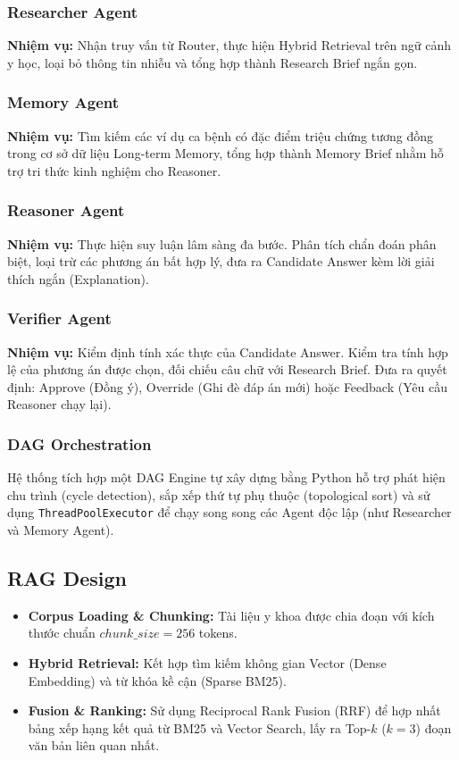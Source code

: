 \subsubsection{Researcher Agent}
\textbf{Nhiệm vụ:} Nhận truy vấn từ Router, thực hiện Hybrid Retrieval trên ngữ cảnh y học, loại bỏ thông tin nhiễu và tổng hợp thành Research Brief ngắn gọn.

\subsubsection{Memory Agent}
\textbf{Nhiệm vụ:} Tìm kiếm các ví dụ ca bệnh có đặc điểm triệu chứng tương đồng trong cơ sở dữ liệu Long-term Memory, tổng hợp thành Memory Brief nhằm hỗ trợ tri thức kinh nghiệm cho Reasoner.

\subsubsection{Reasoner Agent}
\textbf{Nhiệm vụ:} Thực hiện suy luận lâm sàng đa bước. Phân tích chẩn đoán phân biệt, loại trừ các phương án bất hợp lý, đưa ra Candidate Answer kèm lời giải thích ngắn (Explanation).

\subsubsection{Verifier Agent}
\textbf{Nhiệm vụ:} Kiểm định tính xác thực của Candidate Answer. Kiểm tra tính hợp lệ của phương án được chọn, đối chiếu câu chữ với Research Brief. Đưa ra quyết định: Approve (Đồng ý), Override (Ghi đè đáp án mới) hoặc Feedback (Yêu cầu Reasoner chạy lại).

\subsubsection{DAG Orchestration}
Hệ thống tích hợp một DAG Engine tự xây dựng bằng Python hỗ trợ phát hiện chu trình (cycle detection), sắp xếp thứ tự phụ thuộc (topological sort) và sử dụng \texttt{ThreadPoolExecutor} để chạy song song các Agent độc lập (như Researcher và Memory Agent).

\subsection{RAG Design}
\begin{itemize}
    \item \textbf{Corpus Loading \& Chunking:} Tài liệu y khoa được chia đoạn với kích thước chuẩn $chunk\_size = 256$ tokens.
    \item \textbf{Hybrid Retrieval:} Kết hợp tìm kiếm không gian Vector (Dense Embedding) và từ khóa kề cận (Sparse BM25).
    \item \textbf{Fusion \& Ranking:} Sử dụng Reciprocal Rank Fusion (RRF) để hợp nhất bảng xếp hạng kết quả từ BM25 và Vector Search, lấy ra Top-$k$ ($k=3$) đoạn văn bản liên quan nhất.
\end{itemize}

